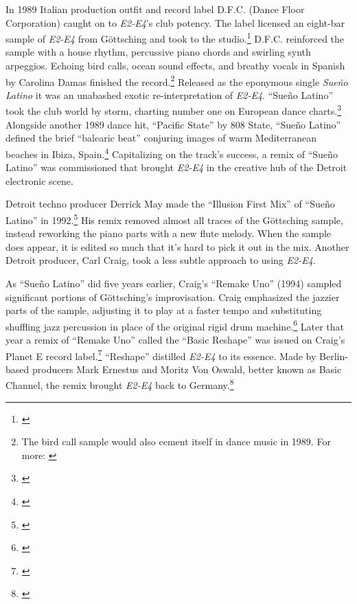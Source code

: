\documentclass[12pt,twoside]{reedthesis}
\begin{document}
In 1989 Italian production outfit and record label D.F.C. (Dance Floor Corporation) caught on to \emph{E2-E4}'s club potency. The label licensed an eight-bar sample of \emph{E2-E4} from G{\"o}ttsching and took to the studio.\footnote{\cite{d.straussManuelGottsching2006}} D.F.C. reinforced the sample with a house rhythm, percussive piano chords and swirling synth arpeggios. Echoing bird calls, ocean sound effects, and breathy vocals in Spanish by Carolina Damas finished the record.\footnote{The bird call sample would also cement itself in dance music in 1989. For more: \cite{sherburneAnacondaPacificState2014}} Released as the eponymous single \emph{Sue{\~n}o Latino} it was an unabashed exotic re-interpretation of \emph{E2-E4}. ``Sue{\~n}o Latino'' took the club world by storm, charting number one on European dance charts.\footnote{\cite{d.straussManuelGottsching2006}} Alongside another 1989 dance hit, ``Pacific State'' by 808 State, ``Sue{\~n}o Latino'' defined the brief ``balearic beat'' conjuring images of warm Mediterranean beaches in Ibiza, Spain.\footnote{\cite{brewsterbillSearchBalearic2008}} Capitalizing on the track's success, a remix of ``Sue{\~n}o Latino'' was commissioned that brought \emph{E2-E4} in the creative hub of the Detroit electronic scene.

Detroit techno producer Derrick May made the ``Illusion First Mix'' of ``Sue{\~n}o Latino'' in 1992.\footnote{\cite{suenolatinoSuenoLatinoDerrick1992}} His remix removed almost all traces of the G{\"o}ttsching sample, instead reworking the piano parts with a new flute melody. When the sample does appear, it is edited so much that it's hard to pick it out in the mix. Another Detroit producer, Carl Craig, took a less subtle approach to using \emph{E2-E4}.

As ``Sue{\~n}o Latino'' did five years earlier, Craig's ``Remake Uno'' (1994) sampled significant portions of G{\"o}ttsching's improvisation. Craig emphasized the jazzier parts of the sample, adjusting it to play at a faster tempo and substituting shuffling jazz percussion in place of the original rigid drum machine.\footnote{\cite{paperclippeopleRemake1994}} Later that year a remix of ``Remake Uno'' called the ``Basic Reshape'' was issued on Craig's Planet E record label.\footnote{\cite{paperclippeopleRemakeBasicReshape1994}} ``Reshape'' distilled \emph{E2-E4} to its essence. Made by Berlin-based producers Mark Ernestus and Moritz Von Oswald, better known as Basic Channel, the remix brought \emph{E2-E4} back to Germany.\footnote{\cite{mcdermottLabelMonthBasic2018}}
\end{document}
